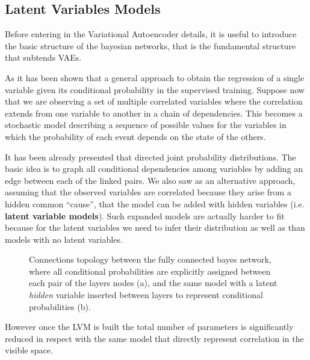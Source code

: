 \subsection{Latent Variables Models}

Before entering in the Variational Autoencoder details, it is useful to introduce the basic structure of the bayesian networks, that is the fundamental structure that subtends \acs{VAE}s. 

As it has been shown that a general approach to obtain the regression of a single variable given its conditional probability in the supervised training. Suppose now that we are observing a set of multiple correlated variables where the correlation extends from one variable to another in a chain of dependencies. This becomes a stochastic model describing a sequence of possible values for the variables in which the probability of each event depends on the state of the others.



%



It has been already presented that directed joint probability distributions. The basic idea is to graph all conditional dependencies among variables by adding an edge between each of the linked pairs. 
We also saw as an alternative approach, assuming that the observed variables are correlated because they arise from a hidden common “cause”, that the model can be added with hidden variables (i.e. \textbf{latent variable models}).
Such expanded models are actually harder to fit because for the latent variables we need to infer their distribution as well as than models with no latent variables.
%
\begin{figure}
    \centering
    \caption{Connections topology between the fully connected bayes network, where all conditional probabilities are explicitly assigned between each pair of the layers nodes  (a), and the same model with a latent \textit{hidden} variable inserted between layers to represent conditional probabilities (b). }
    \label{fig:mixture_models}
\end{figure}
%
However once the \acs{LVM} is built the total number of parameters is significantly reduced in respect with the same model that directly represent correlation in the visible space. 



